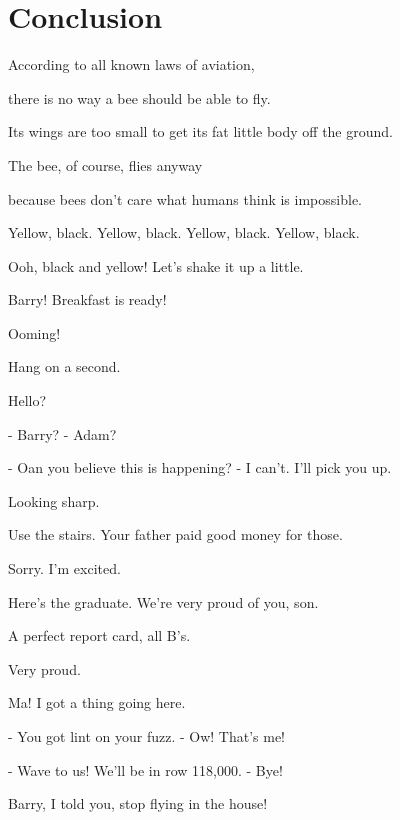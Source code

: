 \documentclass[journal]{IEEEtran}
\begin{document}




\section{Conclusion}
According to all known laws
of aviation,

  
there is no way a bee
should be able to fly.

  
Its wings are too small to get
its fat little body off the ground.

  
The bee, of course, flies anyway

  
because bees don't care
what humans think is impossible.

  
Yellow, black. Yellow, black.
Yellow, black. Yellow, black.

  
Ooh, black and yellow!
Let's shake it up a little.

  
Barry! Breakfast is ready!

  
Ooming!

  
Hang on a second.

  
Hello?

  
- Barry?
- Adam?

  
- Oan you believe this is happening?
- I can't. I'll pick you up.

  
Looking sharp.

  
Use the stairs. Your father
paid good money for those.

  
Sorry. I'm excited.

  
Here's the graduate.
We're very proud of you, son.

  
A perfect report card, all B's.

  
Very proud.

  
Ma! I got a thing going here.

  
- You got lint on your fuzz.
- Ow! That's me!

  
- Wave to us! We'll be in row 118,000.
- Bye!

  
Barry, I told you,
stop flying in the house!
\end{document}
